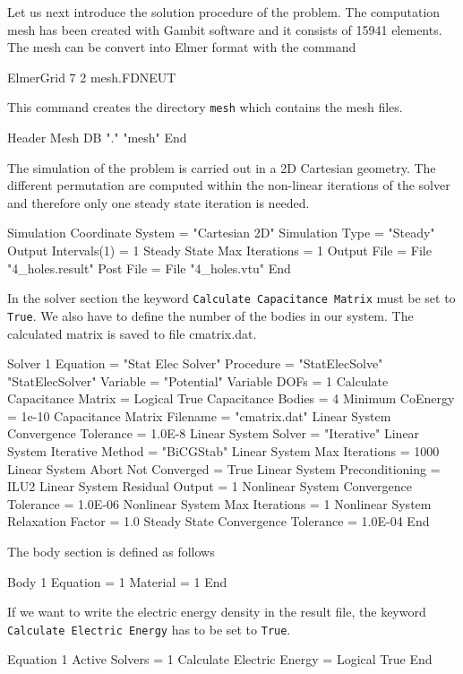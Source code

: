 \begin{flushleft}
Let us next introduce the solution procedure of the problem.
The computation mesh has been created with Gambit software and it consists of 15941 elements. The mesh can be convert into Elmer format with the command

\ttbegin
ElmerGrid 7 2 mesh.FDNEUT
\ttend

This command creates the directory {\tt mesh} which contains the mesh files. 

\ttbegin
Header
  Mesh DB "." "mesh"
End
\ttend

The simulation of the problem is carried out in a 2D Cartesian geometry.
The different permutation are computed within the non-linear iterations of the solver and therefore only one
steady state iteration is needed.

\ttbegin
Simulation
  Coordinate System = "Cartesian 2D"
  Simulation Type = "Steady"
  Output Intervals(1) = 1 
  Steady State Max Iterations = 1
  Output File = File "4_holes.result"
  Post File =   File "4_holes.vtu"
End
\ttend

In the solver section the keyword {\tt Calculate Capacitance Matrix} must be set to {\tt True}. 
We also have to define the number of the bodies in our system. 
The calculated matrix is saved to file cmatrix.dat.

\ttbegin
Solver 1
  Equation = "Stat Elec Solver"
  Procedure = "StatElecSolve" "StatElecSolver"
  Variable = "Potential"
  Variable DOFs = 1
  Calculate Capacitance Matrix = Logical True
  Capacitance Bodies = 4
  Minimum CoEnergy = 1e-10
  Capacitance Matrix Filename = "cmatrix.dat"
  Linear System Convergence Tolerance = 1.0E-8
  Linear System Solver = "Iterative"
  Linear System Iterative Method = "BiCGStab"
  Linear System Max Iterations = 1000
  Linear System Abort Not Converged = True
  Linear System Preconditioning = ILU2
  Linear System Residual Output = 1
  Nonlinear System Convergence Tolerance =  1.0E-06
  Nonlinear System Max Iterations = 1
  Nonlinear System Relaxation Factor = 1.0
  Steady State Convergence Tolerance =  1.0E-04
End
\ttend

The body section is defined as follows

\ttbegin
Body 1
  Equation = 1
  Material = 1
End
\ttend                                      

If we want to write the electric energy density in the result file, the keyword {\tt Calculate Electric Energy} has to be set to {\tt True}.      

\ttbegin                                                           
Equation 1
  Active Solvers =  1
  Calculate Electric Energy = Logical True
End
\ttend


\end{flushleft}
